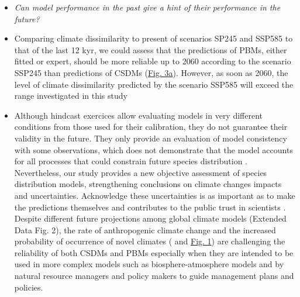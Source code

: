 \documentclass[pdflatex, sn-nature]{sn-jnl}%
\begin{document}
\begin{itemize}
\item \emph{Can model performance in the past give a hint of their performance in the future?}\par
\item Comparing climate dissimilarity to present of scenarios SP245 and SSP585 to that of the last 12 kyr, we  could assess that the predictions of PBMs, either fitted or expert, should be more reliable up to 2060 according to the scenario SSP245 than predictions of CSDMs (\hyperref[past_performance]{Fig. 3a}). However, as soon as 2060, the level of climate dissimilarity predicted by the scenario SSP585 will exceed the range investigated in this study
\item Although hindcast exercices allow evaluating models in very different conditions from those used for their calibration, they do not guarantee their validity in the future. They only provide an evaluation of model consistency with some observations, which does not demonstrate that the model accounts for all processes that could constrain future species distribution \cite{Oreskes1994}. Nevertheless, our study provides a new  objective assessment of species distribution models, strengthening conclusions on climate changes impacts and uncertainties. Acknowledge these uncertainties is as important as to make the predictions themselves \cite{Beale2012} and contributes to the public trust in scientists \cite{Berkhout2010}. Despite different future projections among global climate models (Extended Data Fig. 2), the rate of anthropogenic climate change and the increased probability of occurrence of novel climates (\cite{Williams2007} and \hyperref[climatic_dissimilarity]{Fig. 1}) are challenging the reliability of both CSDMs and PBMs especially when they are intended to be used in more complex models such as biosphere-atmosphere models and by natural resource managers and policy makers to guide management plans and policies.

\end{itemize}
\end{document}
